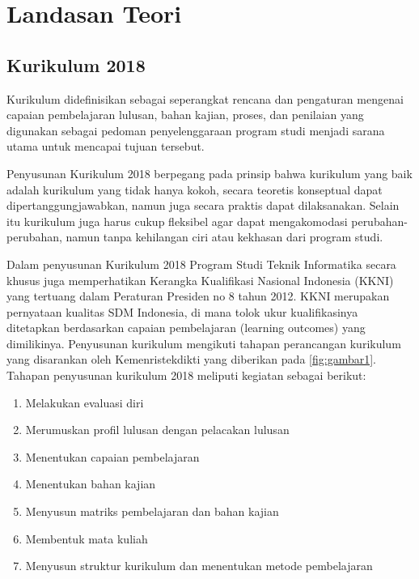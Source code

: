 \chapter{Landasan Teori}
\label{chap:teori}

\section{Kurikulum 2018}
Kurikulum didefinisikan sebagai seperangkat rencana dan pengaturan mengenai capaian pembelajaran lulusan, bahan kajian, proses, dan penilaian yang digunakan sebagai pedoman penyelenggaraan program studi menjadi sarana utama untuk mencapai tujuan tersebut.

Penyusunan Kurikulum 2018 berpegang pada prinsip bahwa kurikulum yang baik adalah kurikulum yang tidak hanya kokoh, secara teoretis konseptual dapat dipertanggungjawabkan, namun juga secara praktis dapat dilaksanakan. Selain itu kurikulum juga harus cukup fleksibel agar dapat mengakomodasi perubahan-perubahan, namun tanpa kehilangan ciri atau kekhasan dari program studi.

Dalam penyusunan Kurikulum 2018 Program Studi Teknik Informatika secara khusus juga memperhatikan Kerangka Kualifikasi Nasional Indonesia (KKNI) yang tertuang dalam Peraturan Presiden no 8 tahun 2012. KKNI merupakan pernyataan kualitas SDM Indonesia, di mana tolok ukur kualifikasinya ditetapkan berdasarkan capaian pembelajaran (learning outcomes) yang dimilikinya. Penyusunan kurikulum mengikuti tahapan perancangan kurikulum yang disarankan oleh Kemenristekdikti yang diberikan pada
\ref{fig:gambar1}. Tahapan penyusunan kurikulum 2018 meliputi kegiatan sebagai berikut:

\begin{enumerate}
    \item Melakukan evaluasi diri
    \item Merumuskan profil lulusan dengan pelacakan lulusan
    \item Menentukan capaian pembelajaran
    \item Menentukan bahan kajian
    \item Menyusun matriks pembelajaran dan bahan kajian
    \item Membentuk mata kuliah
    \item Menyusun struktur kurikulum dan menentukan metode pembelajaran
\end{enumerate}

